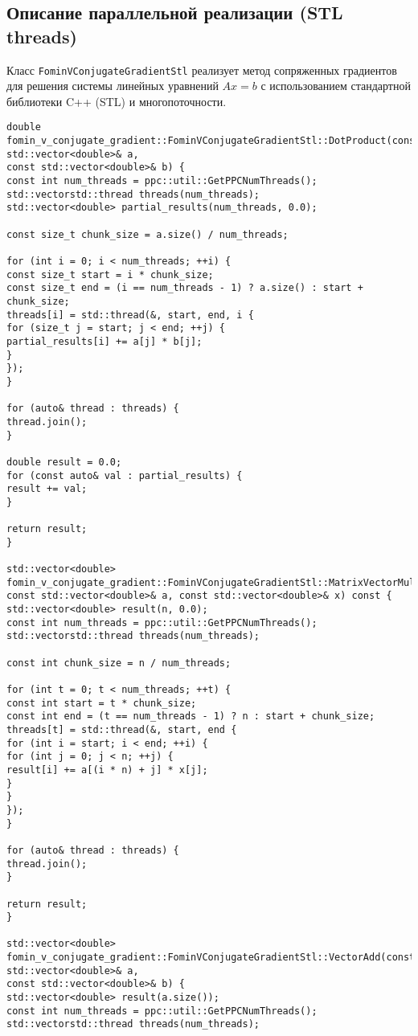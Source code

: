 \documentclass[12pt]{article}
\begin{document}
\subsection{Описание параллельной реализации (STL threads)}

\hspace*{1.35em}Класс \texttt{FominVConjugateGradientStl} реализует метод сопряженных градиентов для решения системы линейных уравнений \( Ax = b \) с использованием стандартной библиотеки C++ (STL) и многопоточности.

\begin{verbatim}
double fomin_v_conjugate_gradient::FominVConjugateGradientStl::DotProduct(const std::vector<double>& a,
const std::vector<double>& b) {
const int num_threads = ppc::util::GetPPCNumThreads();
std::vectorstd::thread threads(num_threads);
std::vector<double> partial_results(num_threads, 0.0);

const size_t chunk_size = a.size() / num_threads;

for (int i = 0; i < num_threads; ++i) {
const size_t start = i * chunk_size;
const size_t end = (i == num_threads - 1) ? a.size() : start + chunk_size;
threads[i] = std::thread(&, start, end, i {
for (size_t j = start; j < end; ++j) {
partial_results[i] += a[j] * b[j];
}
});
}

for (auto& thread : threads) {
thread.join();
}

double result = 0.0;
for (const auto& val : partial_results) {
result += val;
}

return result;
}

std::vector<double> fomin_v_conjugate_gradient::FominVConjugateGradientStl::MatrixVectorMultiply(
const std::vector<double>& a, const std::vector<double>& x) const {
std::vector<double> result(n, 0.0);
const int num_threads = ppc::util::GetPPCNumThreads();
std::vectorstd::thread threads(num_threads);

const int chunk_size = n / num_threads;

for (int t = 0; t < num_threads; ++t) {
const int start = t * chunk_size;
const int end = (t == num_threads - 1) ? n : start + chunk_size;
threads[t] = std::thread(&, start, end {
for (int i = start; i < end; ++i) {
for (int j = 0; j < n; ++j) {
result[i] += a[(i * n) + j] * x[j];
}
}
});
}

for (auto& thread : threads) {
thread.join();
}

return result;
}

std::vector<double> fomin_v_conjugate_gradient::FominVConjugateGradientStl::VectorAdd(const std::vector<double>& a,
const std::vector<double>& b) {
std::vector<double> result(a.size());
const int num_threads = ppc::util::GetPPCNumThreads();
std::vectorstd::thread threads(num_threads);


\end{verbatim}
\end{document}
